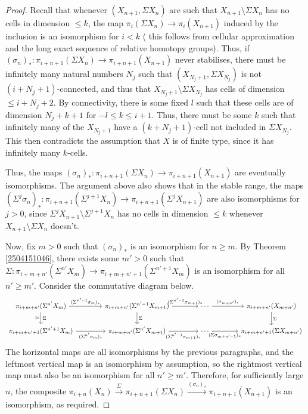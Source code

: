 \documentclass[11pt, titlepage]{article} %
\numberwithin{equation}{subsection}
\theoremstyle{plain}
\theoremstyle{definition}
\begin{document}
\begin{proof}
Recall that whenever \((X_{n+1}, \Sigma X_n)\) are such that \(X_{n+1}\setminus \Sigma X_n\) has no cells in dimension \(\leq k\), the map \(\pi_i(\Sigma X_n)\to \pi_i(X_{n+1})\) induced by the inclusion is an isomorphism for \(i<k\) (%
this follows from cellular approximation and the long exact sequence of relative homotopy groups). Thus, if \((\sigma_n)_* : \pi_{i+n+1}(\Sigma X_n)\to \pi_{i+n+1}(X_{n+1})\) never stabilises, there must be infinitely many natural numbers \(N_j\) such that \((X_{N_j+1}, \Sigma X_{N_j})\) is not \((i+N_j+1)\)-connected, and thus that \(X_{N_j+1}\setminus \Sigma X_{N_j}\) has cells of dimension \(\leq i+N_j+2\). By connectivity, there is some fixed \(l\) such that these cells are of dimension \(N_j+k+1\) for \(-l\leq k \leq i+1\). Thus, there must be some \(k\) such that infinitely many of the \(X_{N_j+1}\) have a \((k+N_j+1)\)-cell not included in \(\Sigma X_{N_j}\). This then contradicts the assumption that \(X\) is of finite type, since it has infinitely many \(k\)-cells. 

Thus, the maps \((\sigma_n)_* : \pi_{i+n+1}(\Sigma X_n)\to \pi_{i+n+1}(X_{n+1})\) are eventually isomorphisms. The argument above also shows that in the stable range, the maps \((\Sigma^j \sigma_n)_* : \pi_{i+n+1}(\Sigma^{j+1}X_n)\to \pi_{i+n+1}(\Sigma^j X_{n+1})\) are also isomorphisms for \(j>0\), since \(\Sigma^j X_{n+1}\setminus\Sigma^{j+1}X_n\) has no cells in dimension \(\leq k\) whenever \(X_{n+1}\setminus\Sigma X_n\) doesn't.

Now, fix \(m >0\) such that \((\sigma_n)_*\) is an isomorphism for \(n\geq m\). By Theorem \ref{2504151046}, there exists some \(m'> 0\) such that \(\Sigma : \pi_{i+m+n'}(\Sigma^{n'}X_m)\to \pi_{i+m+n'+1}(\Sigma^{n'+1}X_m)\) is an isomorphism for all \(n'\geq m'\). Consider the  commutative diagram below. %
\[\begin{tikzcd}[column sep=9ex]
 \pi_{i+m+n'}(\Sigma^{n'}X_m) \arrow[r, "(\Sigma^{n'-1}\sigma_m)_*"] \arrow{d}{\Sigma}[swap]{\cong}  & \pi_{i+m+n'}(\Sigma^{n'-1}X_{m+1}) \arrow[r, "(\Sigma^{n'-2}\sigma_{m+1})_*"] \arrow[d, "\Sigma"] & \cdots \arrow[r, "(\sigma_{m+n'})_*"] & \pi_{i+m+n'}(X_{m+n'}) \arrow[d, "\Sigma"]\\
 \pi_{i+m+n'+1}(\Sigma^{n'+1}X_m) \arrow[r, swap, "(\Sigma^{n'}\sigma_m)_*"]  & \pi_{i+m+n'}(\Sigma^{n'}X_{m+1}) \arrow[r, "(\Sigma^{n'-1}\sigma_{m+1})_*"'] & \cdots \arrow[r, "(\Sigma \sigma_{m+n'-1})_*"'] & \pi_{i+m+n'+1}(\Sigma X_{m+n'}) 
 \end{tikzcd}\]
The horizontal maps are all isomorphisms by the previous paragraphs, and the leftmost vertical map is an isomorphism by assumption, so the rightmost vertical map must also be an isomorphism for all \(n' \geq m'\). Therefore, for sufficiently large \(n\), the composite \(\pi_{i+n}(X_n) \xrightarrow{\Sigma}\pi_{i+n+1}(\Sigma X_{n})\xrightarrow{(\sigma_n)_*}\pi_{i+n+1}(X_{n+1})\) is an isomorphism, as required. 
\end{proof}
\end{document}
